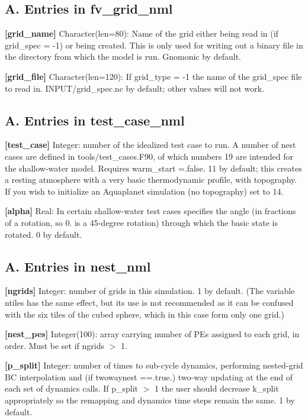 \subsection*{A. Entries in fv\+\_\+grid\+\_\+nml}

{\bfseries \mbox{[}grid\+\_\+name\mbox{]}} Character(len=80)\+: Name of the grid either being read in (if grid\+\_\+spec = -\/1) or being created. This is only used for writing out a binary file in the directory from which the model is run. Gnomonic by default.

{\bfseries \mbox{[}grid\+\_\+file\mbox{]}} Character(len=120)\+: If grid\+\_\+type = -\/1 the name of the grid\+\_\+spec file to read in. I\+N\+P\+U\+T/grid\+\_\+spec.\+nc by default; other values will not work.

\subsection*{A. Entries in test\+\_\+case\+\_\+nml}

{\bfseries \mbox{[}test\+\_\+case\mbox{]}} Integer\+: number of the idealized test case to run. A number of nest cases are defined in tools/test\+\_\+cases.\+F90, of which numbers 19 are intended for the shallow-\/water model. Requires warm\+\_\+start =.false. 11 by default; this creates a resting atmosphere with a very basic thermodynamic profile, with topography. If you wish to initialize an Aquaplanet simulation (no topography) set to 14.

{\bfseries \mbox{[}alpha\mbox{]}} Real\+: In certain shallow-\/water test cases specifies the angle (in fractions of a rotation, so 0. is a 45-\/degree rotation) through which the basic state is rotated. 0 by default.

\subsection*{A. Entries in nest\+\_\+nml}

{\bfseries \mbox{[}ngrids\mbox{]}} Integer\+: number of grids in this simulation. 1 by default. (The variable ntiles has the same effect, but its use is not recommended as it can be confused with the six tiles of the cubed sphere, which in this case form only one grid.)

{\bfseries \mbox{[}nest\+\_\+pes\mbox{]}} Integer(100)\+: array carrying number of P\+Es assigned to each grid, in order. Must be set if ngrids $>$ 1.

{\bfseries \mbox{[}p\+\_\+split\mbox{]}} Integer\+: number of times to sub-\/cycle dynamics, performing nested-\/grid BC interpolation and (if twowaynest ==.true.) two-\/way updating at the end of each set of dynamics calls. If p\+\_\+split $>$ 1 the user should decrease k\+\_\+split appropriately so the remapping and dynamics time steps remain the same. 1 by default.

